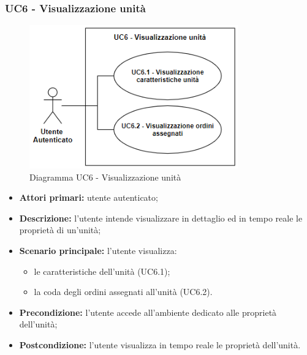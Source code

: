\subsubsection{UC6 - Visualizzazione unità}
    \begin{figure}[h!]
        \centering
        \includegraphics[width=9cm]{images/uc6.png}  
        \caption{Diagramma UC6 - Visualizzazione unità}
    \end{figure}
    \begin{itemize}
        \item \textbf{Attori primari:} utente autenticato;
        \item \textbf{Descrizione:} l'utente intende visualizzare in dettaglio ed in tempo reale le proprietà di un'unità;
        \item \textbf{Scenario principale:} l'utente visualizza:
        \begin{itemize}
            \item le caratteristiche dell'unità (UC6.1);
            \item la coda degli ordini assegnati all'unità (UC6.2).
        \end{itemize}
        \item \textbf{Precondizione:} l'utente accede all'ambiente dedicato alle proprietà dell'unità;
        \item \textbf{Postcondizione:} l'utente visualizza in tempo reale le proprietà dell'unità.
    \end{itemize}

